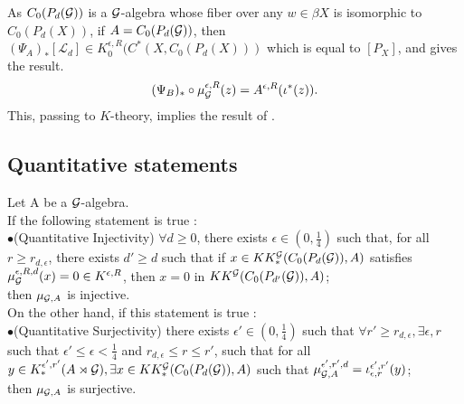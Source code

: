 \begin{itemize}
As $C_0(P_d(\mathcal G))$ is a $\mathcal G$-algebra whose fiber over any $w\in\beta X$ is isomorphic to $C_0(P_d(X))$, if $A=C_0(P_d(\mathcal G))$, then $(\Psi_A)_*[\mathcal L_d]\in K^{\epsilon , R}_0(C^*(X,C_0(P_d(X)))$ which is equal to $[P_X]$, and gives the result.
\[(\Psi_B)_*\circ\mu^{\epsilon,R}_\mathcal G (z) = A^{\epsilon,R}(\iota^*(z)).\]
This, passing to $K$-theory, implies the result of \cite{SkTuYu}.\\
\end{itemize}

\subsection{Quantitative statements}

\begin{prop} 
Let A be a $\mathcal G$-algebra.\\
If the following statement is true :\\

$\bullet$(Quantitative Injectivity) $\forall d\geq 0$, there exists $\epsilon\in (0,\frac{1}{4})$ such that, for all $r\geq r_{d,\epsilon}$, there exists $d'\geq d$ such that if $x\in KK_*^\mathcal G(C_0(P_d(\mathcal G)),A)$ satisfies $\mu_\mathcal G^{\epsilon,R,d}(x)=0\in K^{\epsilon,R}$, then $x=0$ in $KK^\mathcal G(C_0(P_{d'}(\mathcal G)),A)$;\\

then $\mu_{\mathcal G,A}$ is injective.\\

On the other hand, if this statement is true : \\

$\bullet$(Quantitative Surjectivity) there exists $\epsilon'\in (0,\frac{1}{4})$ such that $\forall r'\geq r_{d,\epsilon},\exists \epsilon,r$ such that $\epsilon'\leq \epsilon<\frac{1}{4}$ and $r_{d,\epsilon}\leq r\leq r'$, such that for all $y\in K_*^{\epsilon',r'}(A\rtimes\mathcal G),\exists x \in KK_*^\mathcal G(C_0(P_d(\mathcal G)),A)$ such that $\mu_{\mathcal G,A}^{\epsilon',r',d}=\iota_{\epsilon,r}^{\epsilon',r'}(y)$;\\

then $\mu_{\mathcal G,A}$ is surjective.
\end{prop}

